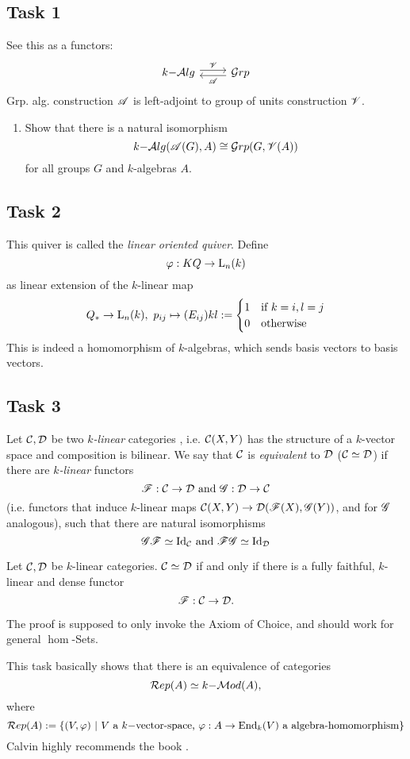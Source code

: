 \subsection*{Task 1}
See this as a functors:
\[
\begin{tikzcd}k\mdas\alc \ar[shift left]{r}{\fcr{V}}\ar[shift right, swap,leftarrow]{r}{\fcr{A}}&\grpc\end{tikzcd}
\]
Grp. alg. construction $\mathscr{A}$ is left-adjoint to group of units construction $\mathscr{V}$.
\begin{enumerate}
	\item Show that there is a natural isomorphism
	\[
	k\mathrm{-}\mathcal{A}lg(\mathscr{A}(G),A) \cong \mathcal{G}rp(G,\mathscr{V}(A))
	\]
	for all groups $G$ and $k$-algebras $A$.
\end{enumerate}
\subsection*{Task 2}
This quiver is called the \emph{linear oriented quiver}.
Define
\[
\varphi:KQ\to\operatorname{L}_n(k)
\]
as linear extension of the $k$-linear map
\[
Q_{\ast}\to \operatorname{L}_n(k),~p_{ij}\mapsto (E_{ij}){kl}:= \begin{cases}1&\text{if }k=i,l=j\\0&\text{otherwise}\end{cases}
\]
This is indeed a homomorphism of $k$-algebras, which sends basis vectors to basis vectors.\par
\subsection*{Task 3}
Let $\mathcal{C},\mathcal{D}$ be two \emph{$k$-linear} categories , i.e. $\mathcal{C}(X,Y)$ has the structure of a $k$-vector space and composition is bilinear. We say that $\mathcal{C}$ is \emph{equivalent} to $\mathcal{D}$ ($\mathcal{C} \simeq \mathcal{D}$) if there are \emph{$k$-linear} functors
\[
\mathscr{F} :\mathcal{C} \to \mathcal{D} \text{ and }\mathscr{G}:\mathcal{D} \to \mathcal{C}
\]
(i.e. functors that induce $k$-linear maps $\mathcal{C}(X,Y)\to \mathcal{D}(\mathscr{F}(X),\mathscr{G}(Y))$, and for $\mathscr{G}$ analogous), such that there are natural isomorphisms
\[
\mathscr{G} \mathscr{F} \simeq \text{Id}_{\mathcal{C}}\text{ and }\mathscr{F} \mathscr{G} \simeq \text{Id}_{\mathcal{D}}
\]
\begin{thm}
	Let $\mathcal{C},\mathcal{D}$ be $k$-linear categories. $\mathcal{C} \simeq \mathcal{D}$ if and only if there is a fully faithful, $k$-linear and dense functor
	\[
	\mathscr{F}: \mathcal{C} \to \mathcal{D} .
	\]
\end{thm}
\begin{rem}
	The proof is supposed to only invoke the Axiom of Choice, and should work for general $\hom$-Sets.
\end{rem}
This task basically shows that there is an equivalence of categories
\[
\mathcal{R}ep(A)\simeq k\mathrm{-} \mathcal{M}od(A),
\]
where
\[
\mathcal{R}ep(A):= \{(V,\varphi)~|~ V\text{ a }k\mathrm{-}\text{vector-space, }\varphi:A\to \operatorname{End}_{k}(V)\text{ a algebra-homomorphism}\}
\]
Calvin highly recommends the book \cite{assem1}.
